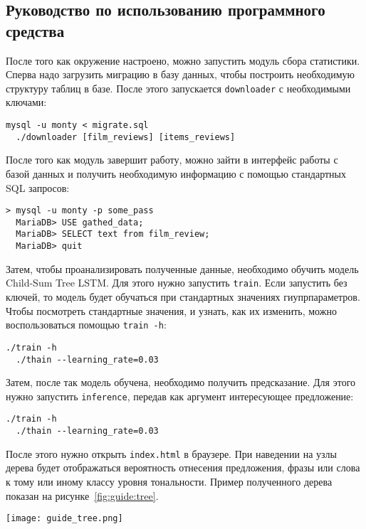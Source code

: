 \subsection{Руководство по использованию программного средства}
После того как окружение настроено, можно запустить модуль сбора статистики. Сперва надо загрузить миграцию в базу данных, чтобы построить необходимую структуру таблиц в базе. После этого запускается \texttt{downloader} с необходимыми ключами:
\medskip
\begin{lstlisting}[style=Python]
  mysql -u monty < migrate.sql
  ./downloader [film_reviews] [items_reviews]
\end{lstlisting}
\medskip

После того как модуль завершит работу, можно зайти в интерфейс работы с базой данных и получить необходимую информацию с помощью стандартных SQL запросов:
\medskip
\begin{lstlisting}[style=Python]
  > mysql -u monty -p some_pass
  MariaDB> USE gathed_data;
  MariaDB> SELECT text from film_review;
  MariaDB> quit
\end{lstlisting}
\medskip

Затем, чтобы проанализировать полученные данные, необходимо обучить модель Child-Sum Tree LSTM\@. Для этого нужно запустить \texttt{train}. Если запустить без ключей, то модель будет обучаться при стандартных значениях гиупрпараметров. Чтобы посмотреть стандартные значения, и узнать, как их изменить, можно воспользоваться помощью \texttt{train -h}:
\medskip
\begin{lstlisting}[style=Python]
  ./train -h
  ./thain --learning_rate=0.03
\end{lstlisting}
\medskip

Затем, после так модель обучена, необходимо получить предсказание. Для этого нужно запустить \texttt{inference}, передав как аргумент интересующее предложение:
\medskip
\begin{lstlisting}[style=Python]
  ./train -h
  ./thain --learning_rate=0.03
\end{lstlisting}
\medskip

После этого нужно открыть \texttt{index.html} в браузере. При наведении на узлы дерева будет отображаться вероятность отнесения предложения, фразы или слова к тому или иному классу уровня тональности. Пример полученного дерева показан на рисунке~\ref{fig:guide:tree}.

\begin{center}
  \texttt{[image: guide\_tree.png]}
  \label{fig:guide:tree}
\end{center}

